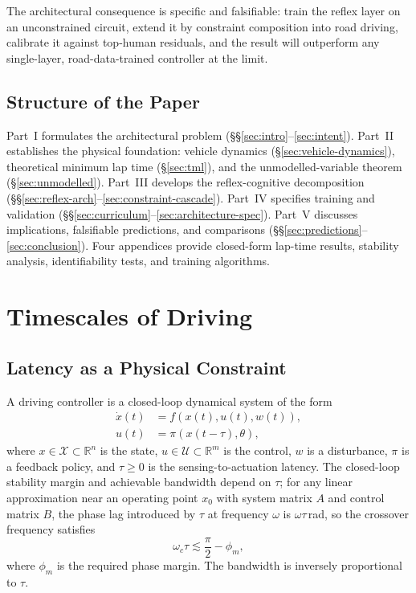 \documentclass[11pt,twocolumn]{article}
\theoremstyle{definition}
\theoremstyle{remark}
\newcommand{\R}{\mathbb{R}}
\newcommand{\cX}{\mathcal{X}}
\newcommand{\cU}{\mathcal{U}}
\begin{document}
\noindent The architectural consequence is specific and falsifiable: train the reflex layer on an unconstrained circuit, extend it by constraint composition into road driving, calibrate it against top-human residuals, and the result will outperform any single-layer, road-data-trained controller at the limit.

\subsection{Structure of the Paper}

Part~I formulates the architectural problem (\S\S\ref{sec:intro}--\ref{sec:intent}). Part~II establishes the physical foundation: vehicle dynamics (\S\ref{sec:vehicle-dynamics}), theoretical minimum lap time (\S\ref{sec:tml}), and the unmodelled-variable theorem (\S\ref{sec:unmodelled}). Part~III develops the reflex-cognitive decomposition (\S\S\ref{sec:reflex-arch}--\ref{sec:constraint-cascade}). Part~IV specifies training and validation (\S\S\ref{sec:curriculum}--\ref{sec:architecture-spec}). Part~V discusses implications, falsifiable predictions, and comparisons (\S\S\ref{sec:predictions}--\ref{sec:conclusion}). Four appendices provide closed-form lap-time results, stability analysis, identifiability tests, and training algorithms.

\section{Timescales of Driving}
\label{sec:timescales}

\subsection{Latency as a Physical Constraint}

A driving controller is a closed-loop dynamical system of the form
\begin{align}
\dot{x}(t) &= f(x(t), u(t), w(t)), \label{eq:dyn}\\
u(t) &= \pi(x(t-\tau), \theta),  \label{eq:ctrl}
\end{align}
where $x \in \cX \subset \R^n$ is the state, $u \in \cU \subset \R^m$ is the control, $w$ is a disturbance, $\pi$ is a feedback policy, and $\tau \ge 0$ is the sensing-to-actuation latency. The closed-loop stability margin and achievable bandwidth depend on $\tau$; for any linear approximation near an operating point $x_0$ with system matrix $A$ and control matrix $B$, the phase lag introduced by $\tau$ at frequency $\omega$ is $\omega\tau$\,rad, so the crossover frequency satisfies \cite{astrom2010feedback}
\begin{equation}
\omega_c \tau \lesssim \frac{\pi}{2} - \phi_m,
\end{equation}
where $\phi_m$ is the required phase margin. The bandwidth is inversely proportional to $\tau$.
\end{document}
